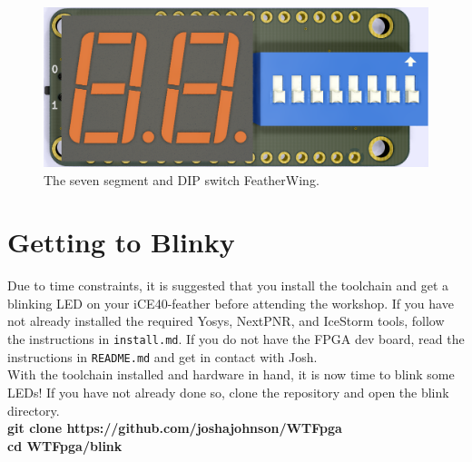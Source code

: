 \documentclass[12pt,a4paper]{article}
\begin{document}
\begin{figure}[H]
\begin{centering}
	\includegraphics[width=\linewidth]{7segment_render.png}
	\caption{The seven segment and DIP switch FeatherWing.}
\end{centering}
\end{figure}
\newpage
\section{Getting to Blinky}
Due to time constraints, it is suggested that you install the toolchain and get a blinking LED on your iCE40-feather before attending the workshop. If you have not already installed the required Yosys, NextPNR, and IceStorm tools, follow the instructions in \texttt{install.md}. If you do not have the FPGA dev board, read the instructions in \texttt{README.md} and get in contact with Josh. \\

\noindent
With the toolchain installed and hardware in hand, it is now time to blink some LEDs! If you have not already done so, clone the repository and open the blink directory.\\

\noindent
\textbf{git clone https://github.com/joshajohnson/WTFpga} \\
\textbf{cd WTFpga/blink}\\
\end{document}
